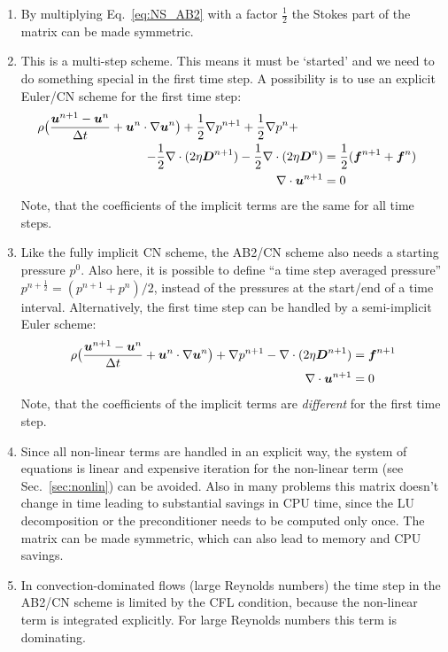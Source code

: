\begin{enumerate}
   \item By multiplying Eq.~\ref{eq:NS_AB2} with a factor $\frac12$ the Stokes part of the matrix can be made symmetric.
   \item This is a multi-step scheme. This means it must be `started' and we need to do something special in
         the first time step. A possibility is to use an explicit Euler/CN scheme for the first time step:
\begin{align}
 \rho \big( \frac{\boldsymbol{u}^{n+1}-\boldsymbol{u}^n}{\Delta t} +
     \boldsymbol{u}^n \cdot \nabla \boldsymbol{u}^{n} \big) 
      + \frac12\nabla p^{n+1} 
      + \frac12\nabla p^{n} +  \qquad\notag\\
         - \frac12\nabla \cdot ( 2 \eta \boldsymbol{D}^{n+1})  
         - \frac12\nabla \cdot ( 2 \eta \boldsymbol{D}^{n}) &=\frac12(\boldsymbol{f}^{n+1}+\boldsymbol{f}^n)\\
\nabla \cdot \boldsymbol{u}^{n+1} &= 0
\label{eq:NS_EU}
\end{align}
   Note, that the coefficients of the implicit terms are the same for all time steps.
   \item Like the fully implicit CN scheme, the AB2/CN scheme also needs a starting pressure $p^0$.
         Also here, it is possible to define ``a time step averaged pressure'' $p^{n+\frac12}=(p^{n+1}+p^{n})/2$, 
         instead of the pressures at the start/end of a time interval. Alternatively, the first time step can be handled by
         a semi-implicit Euler scheme:
\begin{align}
 \rho \big( \frac{\boldsymbol{u}^{n+1}-\boldsymbol{u}^n}{\Delta t} +
     \boldsymbol{u}^n \cdot \nabla \boldsymbol{u}^{n} \big) 
      + \nabla p^{n+1} 
         - \nabla \cdot ( 2 \eta \boldsymbol{D}^{n+1})  &=\boldsymbol{f}^{n+1}\\
\nabla \cdot \boldsymbol{u}^{n+1} &= 0
\label{eq:NS_AB2_firststep}
\end{align}
   Note, that the coefficients of the implicit terms are \emph{different} for the first time step. 
   \item Since all non-linear terms are handled in an explicit way, the system of equations is linear and
         expensive iteration for the non-linear term (see Sec.~\ref{sec:nonlin}) can be avoided.
        Also in many problems this matrix doesn't change in time
        leading to substantial savings in CPU time, since the LU decomposition or the preconditioner needs to be computed only once.
        The matrix can be made symmetric, which can also lead to memory and CPU savings.
   \item In convection-dominated flows (large Reynolds numbers) the time step in the AB2/CN scheme is limited by the CFL condition, because the non-linear term is integrated explicitly. For large Reynolds numbers this term is dominating.
\end{enumerate}
